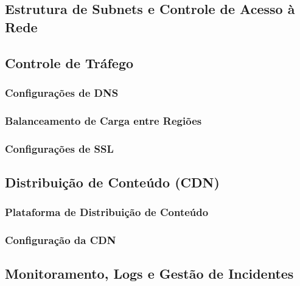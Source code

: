 \subsection{Estrutura de Subnets e Controle de Acesso à Rede}

\subsection{Controle de Tráfego}

\subsubsection{Configurações de DNS}

\subsubsection{Balanceamento de Carga entre Regiões}

\subsubsection{Configurações de SSL}

\subsection{Distribuição de Conteúdo (CDN)}

\subsubsection{Plataforma de Distribuição de Conteúdo}

\subsubsection{Configuração da CDN}

\subsection{Monitoramento, Logs e Gestão de Incidentes}

